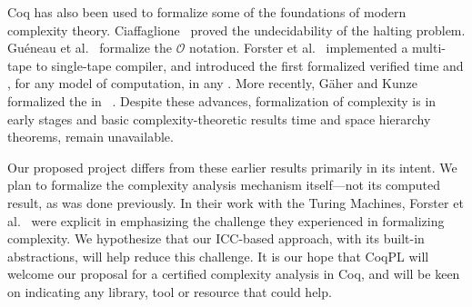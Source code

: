 Coq has also been used to formalize some of the foundations of modern complexity theory.
    {Ciaffaglione}~\cite{ciaffaglione2016} proved the undecidability of the halting problem.
    {Guéneau et al.}~\cite{gueneau2018} formalize the \(\mathcal{O}\) notation.
    {Forster et al.}~\cite{forster2020} implemented a multi-tape to single-tape compiler, and introduced the first formalized
     verified \wrt time and ,
    for any model of computation, in any .
More recently, Gäher and Kunze formalized the  in ~\cite{gaher2021}.
Despite these advances, formalization of complexity is in early stages and basic complexity-theoretic results \eg time and space hierarchy theorems, remain unavailable.

Our proposed project differs from these earlier results primarily in its intent.
We plan to formalize the complexity analysis mechanism itself---not its computed result, as was done previously.
In their work with the Turing Machines, Forster et al.~\cite{forster2020} were explicit in emphasizing the challenge they experienced in formalizing complexity.
We hypothesize that our ICC-based approach, with \eg its built-in abstractions, will help reduce this challenge.
It is our hope that CoqPL will welcome our proposal for a certified complexity analysis in Coq, and will be keen on indicating any library, tool or resource that could help.
